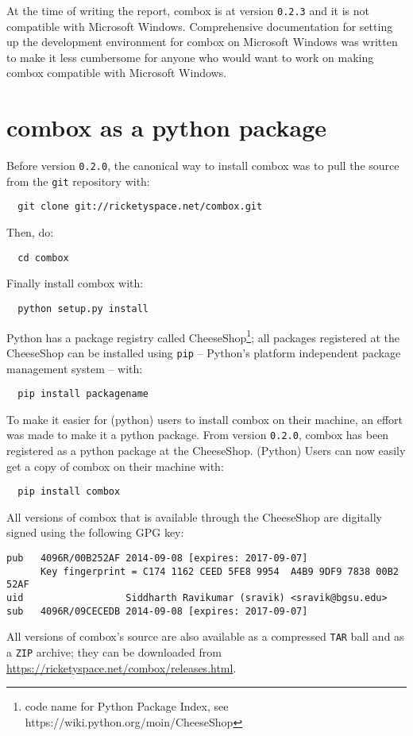 At the time of writing the report, combox is at version \verb+0.2.3+
and it is not compatible with Microsoft Windows. Comprehensive
documentation for setting up the development environment for combox on
Microsoft Windows was written\cite{doc:combox-setup-windoze} to make
it less cumbersome for anyone who would want to work on making combox
compatible with Microsoft Windows.

\section{combox as a python package}\label{3-pypi}

Before version \verb+0.2.0+, the canonical way to install combox was
to pull the source from the \verb+git+ repository with:

\begin{verbatim}
  git clone git://ricketyspace.net/combox.git
\end{verbatim}

Then, do:

\begin{verbatim}
  cd combox
\end{verbatim}

Finally install combox with:

\begin{verbatim}
  python setup.py install
\end{verbatim}

Python has a package registry called CheeseShop\footnote{code name for
  Python Package Index, see https://wiki.python.org/moin/CheeseShop};
all packages registered at the CheeseShop can be installed using
\verb+pip+ -- Python's platform independent package management
system\cite{py:pip} -- with:

\begin{verbatim}
  pip install packagename
\end{verbatim}

To make it easier for (python) users to install combox on their
machine, an effort was made to make it a python
package\cite{py:package-guide}. From version \verb+0.2.0+, combox has
been registered as a python package at the CheeseShop. (Python) Users
can now easily get a copy of combox on their machine with:

\begin{verbatim}
  pip install combox
\end{verbatim}

All versions of combox that is available through the CheeseShop are
digitally signed using the following GPG key:

\begin{verbatim}
pub   4096R/00B252AF 2014-09-08 [expires: 2017-09-07]
      Key fingerprint = C174 1162 CEED 5FE8 9954  A4B9 9DF9 7838 00B2 52AF
uid                  Siddharth Ravikumar (sravik) <sravik@bgsu.edu>
sub   4096R/09CECEDB 2014-09-08 [expires: 2017-09-07]
\end{verbatim}

All versions of combox's source are also available as a compressed
\verb+TAR+ ball and as a \verb+ZIP+ archive; they can be downloaded
from \url{https://ricketyspace.net/combox/releases.html}.

